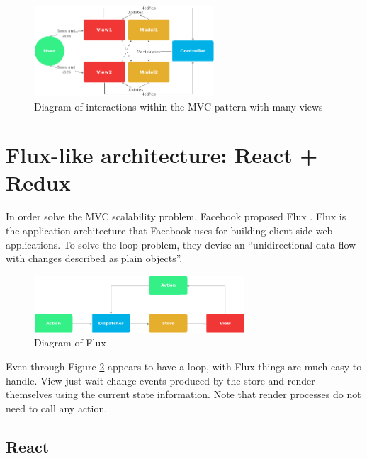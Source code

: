 \begin{figure}[htb]
	\begin{center}
		\includegraphics[width=0.6\textwidth]{./figures/mvc-complex.png}
		\caption{Diagram of interactions within the MVC pattern with many views}
		\label{F:mvc-complex}
	\end{center}
\end{figure}

\section{Flux-like architecture: React + Redux}

In order solve the MVC scalability problem, Facebook proposed Flux
\cite{flux-web}. Flux is the application architecture that Facebook uses for
building client-side web applications. To solve the loop problem, they devise
an “unidirectional data flow with changes described as plain objects”.

\begin{figure}[htb]
	\begin{center}
		\includegraphics[width=0.7\textwidth]{./figures/flux.png}
		\caption{Diagram of Flux}
		\label{F:flux}
	\end{center}
\end{figure}

Even through Figure \ref{F:flux} appears to have a loop, with Flux things are
much easy to handle. View just wait change events produced by the store and
render themselves using the current state information. Note that render
processes do not need to call any action.

\subsection{React}

